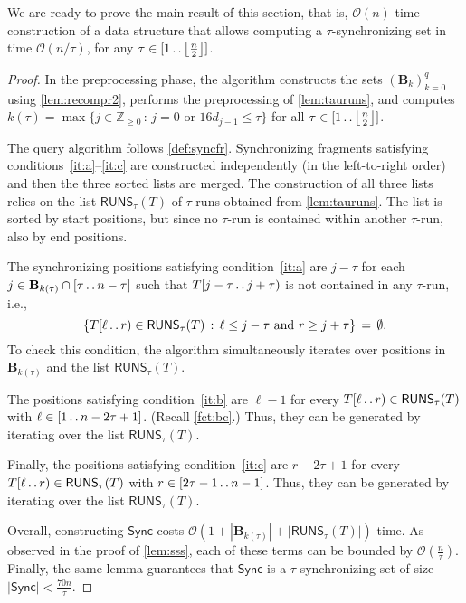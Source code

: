 \documentclass[a4paper]{article}
\theoremstyle{definition}
\theoremstyle{remark}
\newcommand{\Zz}{\mathbb{Z}_{\ge 0}}
\newcommand{\B}{\mathbf{B}}
\newcommand{\floor}[1]{\left\lfloor #1 \right\rfloor}
\newcommand{\dd}{\mathinner{\ldotp\ldotp}}
\newcommand{\RUNS}{\mathsf{RUNS}}
\newcommand{\Oh}{\mathcal{O}}
\renewcommand{\S}{\mathsf{Sync}}
\renewcommand{\S}{\mathsf{Sync}}
\begin{document}
We are ready to prove the main result of this section, that is, $\Oh(n)$-time construction of a data structure that allows computing
a $\tau$-synchronizing set in time $\Oh(n/\tau)$, for any $\tau\in [1\dd \floor{\frac{n}{2}}]$.

\thmsss*
\begin{proof}
  In the preprocessing phase, the algorithm constructs the sets $(\B_k)_{k=0}^q$ using \cref{lem:recompr2},
  performs the preprocessing of \cref{lem:tauruns},
  and computes
  $k(\tau) = \max\{j \in \Zz\,:\, j=0 \text{ or }16d_{j-1} \le \tau\}$ for all $\tau \in [1\dd \floor{\tfrac{n}{2}}]$.

  The query algorithm follows \cref{def:syncfr}. Synchronizing fragments satisfying conditions~\ref{it:a}--\ref{it:c}
  are constructed independently (in the left-to-right order) and then the three sorted lists are merged.
  The construction of all three lists relies on the list $\RUNS_\tau(T)$ of $\tau$-runs obtained from \cref{lem:tauruns}. The list is sorted by start positions, but since no $\tau$-run is contained within another $\tau$-run, also by end positions.

  The synchronizing positions satisfying condition~\ref{it:a} are $j-\tau$ for each $j\in \B_{k(\tau)}\cap [\tau\dd n-\tau]$ such that $T[j-\tau\dd j+\tau)$ is not contained in any $\tau$-run,
  i.e., \[\{T[\ell\dd r)\in \RUNS_{\tau}(T)\,:\, \ell \le j-\tau\text{ and } r \ge j+\tau\}\,=\, \emptyset.\]
  To check this condition, the algorithm simultaneously iterates over positions in $\B_{k(\tau)}$ and 
  the list $\RUNS_{\tau}(T)$.

  The positions satisfying condition~\ref{it:b} are $\ell-1$ for every $T[\ell\dd r)\in \RUNS_{\tau}(T)$ with $\ell \in [1\dd n-2\tau+1]$.
  (Recall \cref{fct:bc}.)
  Thus, they can be generated by iterating over the list $\RUNS_{\tau}(T)$.

  Finally, the positions satisfying condition~\ref{it:c} are $r-2\tau+1$ for every $T[\ell\dd r)\in \RUNS_{\tau}(T)$ with $r \in [2\tau-1\dd n-1]$.
  Thus, they can be generated by iterating over the list $\RUNS_{\tau}(T)$.

  Overall, constructing $\S$ costs $\Oh(1+|\B_{k(\tau)}|+|\RUNS_{\tau}(T)|)$ time.
  As observed in the proof of \cref{lem:sss}, each of these terms can be bounded by $\Oh(\frac{n}{\tau})$.
  Finally, the same lemma guarantees that $\S$ is a $\tau$-synchronizing set of size $|\S| < \tfrac{70n}{\tau}$.
\end{proof}
\end{document}
